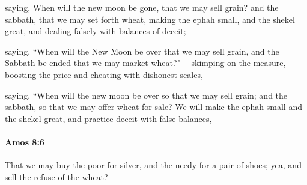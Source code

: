 			\begin{versebox}
					\item[BHS] 
					\item[LXX] 
					\item[ASV] saying, When will the new moon be gone, that we may sell grain? and the sabbath, that we may set forth wheat, making the ephah small, and the shekel great, and dealing falsely with balances of deceit;
					\item[NIV] saying, “When will the New Moon be over that we may sell grain, and the Sabbath be ended that we may market wheat?"— skimping on the measure, boosting the price and cheating with dishonest scales,
					\item[NRSV] saying, “When will the new moon be over so that we may sell grain; and the sabbath, so that we may offer wheat for sale? We will make the ephah small and the shekel great, and practice deceit with false balances,
			\end{versebox}

		\paragraph{Amos 8:6} %
			\label{AMOS-8-6}

			That we may buy the poor for silver, and the needy for a pair of shoes; yea, and sell the refuse of the wheat?

